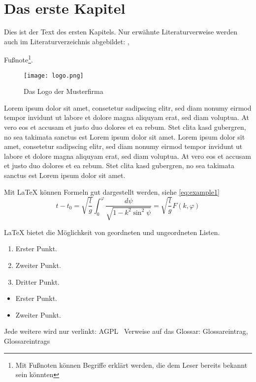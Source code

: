
\chapter{Das erste Kapitel}
Dies ist der Text des ersten Kapitels.
Nur erwähnte Literaturverweise werden auch im Literaturverzeichnis abgebildet: \cite[S.12 ff]{baumgartner:2002}, \cite[S.1-3]{dreyfus:1980}

Fußnote\footnote{Mit Fußnoten können Begriffe erklärt werden, die dem Leser bereits bekannt sein könnten}.

\begin{wrapfigure}{r}{.4\textwidth}
    \centering
    \texttt{[image: logo.png]}
    \vspace{-10pt}
    \caption{Das Logo der Musterfirma\footnotemark}
\end{wrapfigure}
Lorem ipsum dolor sit amet, consetetur sadipscing elitr, sed diam nonumy eirmod tempor invidunt ut labore et dolore magna aliquyam erat, sed diam voluptua.
At vero eos et accusam et justo duo dolores et ea rebum.
Stet clita kasd gubergren, no sea takimata sanctus est Lorem ipsum dolor sit amet.
Lorem ipsum dolor sit amet, consetetur sadipscing elitr, sed diam nonumy eirmod tempor invidunt ut labore et dolore magna aliquyam erat, sed diam voluptua.
At vero eos et accusam et justo duo dolores et ea rebum.
Stet clita kasd gubergren, no sea takimata sanctus est Lorem ipsum dolor sit amet.

Mit LaTeX können Formeln gut dargestellt werden, siehe \ref{eq:example1}
\begin{equation}
    t-t_{0}=\sqrt{\frac{l}{g}}\int_{0}^{\varphi}{\frac{d\psi}{\sqrt{1-k^{2}\sin^{2} {\psi}}}} = \sqrt{\frac{l}{g}} F(k,\varphi)
    \label{eq:example1}
\end{equation}

LaTeX bietet die Möglichkeit von geordneten und ungeordneten Listen.
\begin{enumerate}
    \item Erster Punkt.
    \item Zweiter Punkt.
    \item {Dritter Punkt.}
\end{enumerate}
\begin{itemize}
    \item Erster Punkt.
    \item Zweiter Punkt.
\end{itemize}

Jede weitere wird nur verlinkt: \acf{AGPL}~\cite{fsf:2007}
Verweise auf das Glossar: \gls{Glossareintrag}, \glspl{Glossareintrag}

